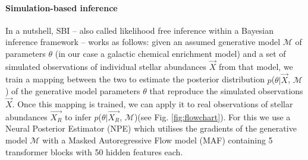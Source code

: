 \documentclass{aa}
\begin{document}
\paragraph{Simulation-based inference}
In a nutshell, SBI \citep[e.g.][]{Cranmer2020,Papamakarios:2021,Gloeckler2024AllinoneSI} -- also called likelihood free inference within a  Bayesian inference framework --  works as follows: given an assumed generative model $\mathcal{M}$ of parameters $\theta$ (in our case a galactic chemical enrichment model) and a set of simulated observations of individual stellar abundances $\Vec{X}$ from that model, we train a mapping between the two to estimate the posterior distribution $p$($\theta|\Vec{X}$, $\mathcal{M}$) of the generative model parameters $\theta$ that reproduce the simulated observations $\Vec{X}$. Once this mapping is trained, we can apply it to real observations of stellar abundances $\Vec{X_R}$ to infer $p$($\theta|\Vec{X_R}$, $\mathcal{M}$)(see Fig. \ref{fig:flowchart}).
For this we use a Neural Posterior Estimator (NPE) \cite{zeghal2022neuralposteriorestimationdifferentiable} which utilises the gradients of the generative model $\mathcal{M}$ with a Masked Autoregressive Flow model (MAF) \cite{papamakarios2018maskedautoregressiveflowdensity} containing 5 transformer blocks with 50 hidden features each.

\end{document}
